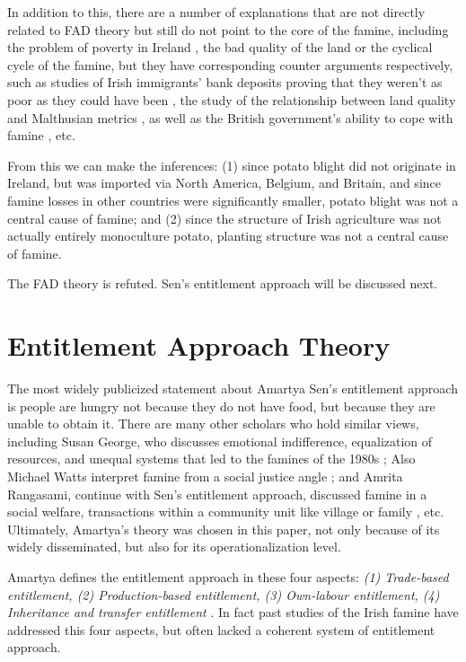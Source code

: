 In addition to this, there are a number of explanations that are not directly related to FAD theory but still do not point to the core of the famine, including the problem of poverty in Ireland \citep{gilleard2016other, gray2010irish}, the bad quality of the land \citep{whelan2012clachans} or the cyclical cycle of the famine, but they have corresponding counter arguments respectively, such as studies of Irish immigrants' bank deposits proving that they weren't as poor as they could have been \citep{wegge2017immigrants}, the study of the relationship between land quality and Malthusian metrics \citep{donnelly2002great}, as well as the British government's ability to cope with famine \citep{kelly2015ireland}, etc.

From this we can make the inferences: (1) since potato blight did not originate in Ireland, but was imported via North America, Belgium, and Britain, and since famine losses in other countries were significantly smaller, potato blight was not a central cause of famine; and (2) since the structure of Irish agriculture was not actually entirely monoculture potato, planting structure was not a central cause of famine.

The FAD theory is refuted. Sen's entitlement approach will be discussed next.

\section{Entitlement Approach Theory}

The most widely publicized statement about Amartya Sen's entitlement approach is people are hungry not because they do not have food, but because they are unable to obtain it. There are many other scholars who hold similar views, including Susan George, who discusses emotional indifference, equalization of resources, and unequal systems that led to the famines of the 1980s \citep{george1990ill}; Also Michael Watts interpret famine from a social justice angle \citep{watts2013silent}; and Amrita Rangasami, continue with Sen's entitlement approach, discussed famine in a social welfare, transactions within a community unit like village or family \citep{rangasami1985failure}, etc. Ultimately, Amartya's theory was chosen in this paper, not only because of its widely disseminated, but also for its operationalization level.

Amartya defines the entitlement approach in these four aspects: \textit{(1) Trade-based entitlement, (2) Production-based entitlement, (3) Own-labour entitlement, (4) Inheritance and transfer entitlement} \citep{sen1982poverty}. In fact past studies of the Irish famine have addressed this four aspects, but often lacked a coherent system of entitlement approach.

